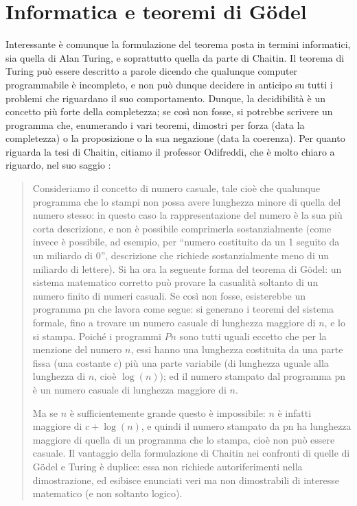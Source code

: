\documentclass[a4paper,10pt]{article}
\begin{document}
\section{Informatica e teoremi di Gödel}

Interessante è comunque la formulazione del teorema posta in termini informatici, sia quella di Alan Turing, e soprattutto quella da parte di Chaitin.
Il teorema di Turing può essere descritto a parole dicendo che qualunque computer programmabile è incompleto, e non può dunque decidere in anticipo su tutti i problemi che riguardano il suo comportamento.
Dunque, la decidibilità è un concetto più forte della completezza; se così non fosse, si potrebbe scrivere un programma che, enumerando i vari teoremi, dimostri per forza (data la completezza) o la proposizione o la sua negazione (data la coerenza).
Per quanto riguarda la tesi di Chaitin, citiamo il professor Odifreddi, che è molto chiaro a riguardo, nel suo saggio \cite{metamorfosi}:
\begin{quote}
Consideriamo il concetto di numero casuale, tale cioè che qualunque programma che lo stampi non possa avere lunghezza minore di quella del numero stesso: in questo caso la rappresentazione del numero è la sua più corta descrizione, e non è possibile comprimerla sostanzialmente (come invece è possibile, ad esempio, per \textquotedblleft numero costituito da un 1 seguito da un miliardo di 0\textquotedblright, descrizione che richiede sostanzialmente meno di un miliardo di lettere).
Si ha ora la seguente forma del teorema di Gödel: un sistema matematico corretto può provare la casualità soltanto di un numero finito di numeri casuali. Se così non fosse, esisterebbe un programma pn che lavora come segue: si generano i teoremi del sistema formale, fino a trovare un numero casuale di lunghezza maggiore di $n$, e lo si stampa. Poiché i programmi $Pn$ sono tutti uguali eccetto che per la menzione del numero $n$, essi hanno una lunghezza costituita da una parte fissa (una costante $c$) più una parte variabile (di lunghezza uguale alla lunghezza di $n$, cioè $\log(n)$); ed il numero stampato dal programma pn è un numero casuale di lunghezza maggiore di $n$.

Ma se $n$ è sufficientemente grande questo è impossibile: $n$ è infatti maggiore di $c + \log(n)$, e quindi il numero stampato da pn ha lunghezza maggiore di quella di un programma che lo stampa, cioè non può essere casuale.
Il vantaggio della formulazione di Chaitin nei confronti di quelle di Gödel e Turing è duplice: essa non richiede autoriferimenti nella dimostrazione, ed esibisce enunciati veri ma non dimostrabili di interesse matematico (e non soltanto logico).
\end{quote}
\end{document}
